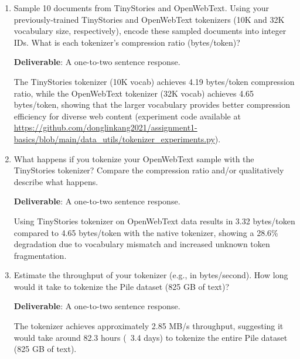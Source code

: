 
\begin{enumerate}[label=(\alph*)]
    \item Sample 10 documents from TinyStories and OpenWebText. Using your previously-trained TinyStories and OpenWebText tokenizers (10K and 32K vocabulary size, respectively), encode these sampled documents into integer IDs. What is each tokenizer's compression ratio (bytes/token)?
    
    \textbf{Deliverable}: A one-to-two sentence response.
    
    \begin{answer}
    The TinyStories tokenizer (10K vocab) achieves 4.19 bytes/token compression ratio, while the OpenWebText tokenizer (32K vocab) achieves 4.65 bytes/token, showing that the larger vocabulary provides better compression efficiency for diverse web content (experiment code available at \url{https://github.com/donglinkang2021/assignment1-basics/blob/main/data_utils/tokenizer_experiments.py}).
    \end{answer}

    \item What happens if you tokenize your OpenWebText sample with the TinyStories tokenizer? Compare the compression ratio and/or qualitatively describe what happens.

    \textbf{Deliverable}: A one-to-two sentence response.

    \begin{answer}
    Using TinyStories tokenizer on OpenWebText data results in 3.32 bytes/token compared to 4.65 bytes/token with the native tokenizer, showing a 28.6\% degradation due to vocabulary mismatch and increased unknown token fragmentation.
    \end{answer}

    \item Estimate the throughput of your tokenizer (e.g., in bytes/second). How long would it take to tokenize the Pile dataset (825 GB of text)?

    \textbf{Deliverable}: A one-to-two sentence response.

    \begin{answer}
    The tokenizer achieves approximately 2.85 MB/s throughput, suggesting it would take around 82.3 hours (~3.4 days) to tokenize the entire Pile dataset (825 GB of text).
    \end{answer}


\end{enumerate}
